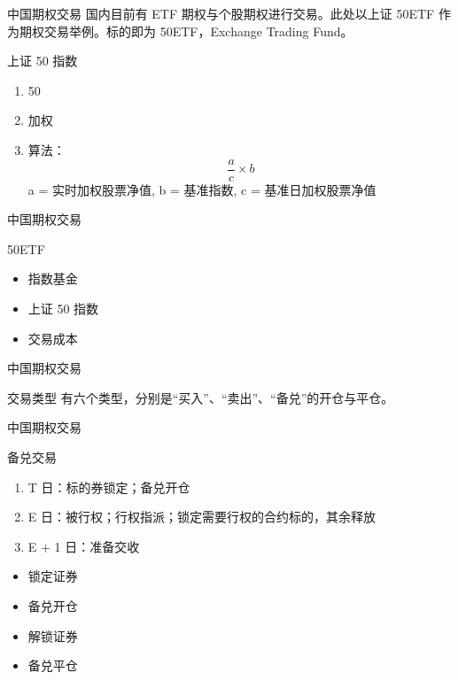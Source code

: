 \documentclass[12pt]{ctexbeamer}	%
\begin{document}
\begin{frame}{中国期权交易}
  国内目前有 ETF 期权与个股期权进行交易。此处以上证 50ETF 作为期权交易举例。标的即为 50ETF，Exchange Trading Fund。
  \begin{block}{上证 50 指数}
    \begin{enumerate}
      \item 50
      \item 加权
      \item 算法：$$\frac{a}{c} \times b$$a = 实时加权股票净值, b = 基准指数, c = 基准日加权股票净值
    \end{enumerate}
  \end{block}
\end{frame}

\begin{frame}{中国期权交易}
  \begin{block}{50ETF}
    \begin{itemize}
      \item 指数基金
      \item 上证 50 指数
      \item 交易成本
    \end{itemize}
  \end{block}
\end{frame}

\begin{frame}{中国期权交易}
  \begin{block}{交易类型}
    有六个类型，分别是“买入”、“卖出”、“备兑”的开仓与平仓。
  \end{block}
\end{frame}

\begin{frame}{中国期权交易}
  \begin{block}{备兑交易}
    \begin{enumerate}
      \item T 日：标的券锁定；备兑开仓
      \item E 日：被行权；行权指派；锁定需要行权的合约标的，其余释放
      \item E + 1 日：准备交收
    \end{enumerate}
    \begin{itemize}
      \item <1-> 锁定证券
      \item <2-> 备兑开仓
      \item <3-> 解锁证券
      \item <4-> 备兑平仓
    \end{itemize}
  \end{block}
\end{frame}
\end{document}
